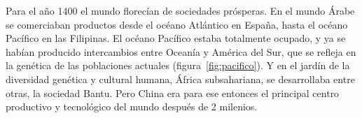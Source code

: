 \documentclass[a4paper,11pt]{book}
\theoremstyle{definition}
\begin{document}




Para el año 1400 el mundo florecían de sociedades prósperas.
%
En el mundo Árabe se comerciaban productos desde el océano Atlántico en España, hasta el océano Pacífico en las Filipinas.
%
El océano Pacífico estaba totalmente ocupado, y ya se habían producido intercambios entre Oceanía y América del Sur, que se refleja en la genética de las poblaciones actuales \cite{ioannidis2020-polynesiaAmerica} (figura~\ref{fig:pacifico}).
%
Y en el jardín de la diversidad genética y cultural humana, África subsahariana, se desarrollaba entre otras, la sociedad Bantu.
%
Pero China era para ese entonces el principal centro productivo y tecnológico del mundo después de 2 milenios.

\end{document}
